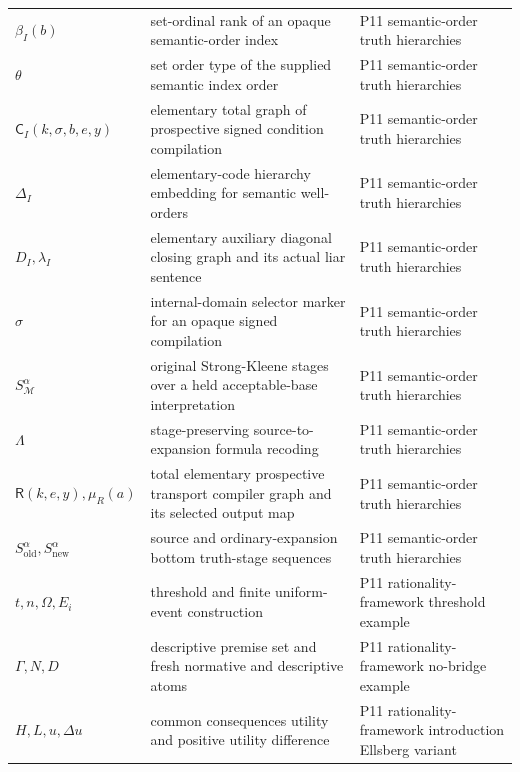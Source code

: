 \begin{longtable}{@{}p{}p{}p{}@{}}
\(\beta_I(b)\) & set-ordinal rank of an opaque semantic-order index & P11 semantic-\allowbreak{}order truth hierarchies \\
\(\theta\) & set order type of the supplied semantic index order & P11 semantic-\allowbreak{}order truth hierarchies \\
\(\mathsf C_I(k,\allowbreak \sigma,\allowbreak b,\allowbreak e,\allowbreak y)\) & elementary total graph of prospective signed condition compilation & P11 semantic-\allowbreak{}order truth hierarchies \\
\(\Delta_I\) & elementary-code hierarchy embedding for semantic well-orders & P11 semantic-\allowbreak{}order truth hierarchies \\
\(D_I,\allowbreak \lambda_I\) & elementary auxiliary diagonal closing graph and its actual liar sentence & P11 semantic-\allowbreak{}order truth hierarchies \\
\(\sigma\) & internal-domain selector marker for an opaque signed compilation & P11 semantic-\allowbreak{}order truth hierarchies \\
\(S_{\mathcal M}^{\alpha}\) & original Strong-Kleene stages over a held acceptable-base interpretation & P11 semantic-\allowbreak{}order truth hierarchies \\
\(\Lambda\) & stage-preserving source-to-expansion formula recoding & P11 semantic-\allowbreak{}order truth hierarchies \\
\(\mathsf R(k,\allowbreak e,\allowbreak y),\allowbreak \mu_R(a)\) & total elementary prospective transport compiler graph and its selected output map & P11 semantic-\allowbreak{}order truth hierarchies \\
\(S^{\alpha}_{\mathrm{old}},\allowbreak S^{\alpha}_{\mathrm{new}}\) & source and ordinary-expansion bottom truth-stage sequences & P11 semantic-\allowbreak{}order truth hierarchies \\
\(t,\allowbreak n,\allowbreak \Omega,\allowbreak E_i\) & threshold and finite uniform-event construction & P11 rationality-\allowbreak{}framework threshold example \\
\(\Gamma,\allowbreak N,\allowbreak D\) & descriptive premise set and fresh normative and descriptive atoms & P11 rationality-\allowbreak{}framework no-\allowbreak{}bridge example \\
\(H,\allowbreak L,\allowbreak u,\allowbreak \Delta u\) & common consequences utility and positive utility difference & P11 rationality-\allowbreak{}framework introduction Ellsberg variant \\

\end{longtable}
